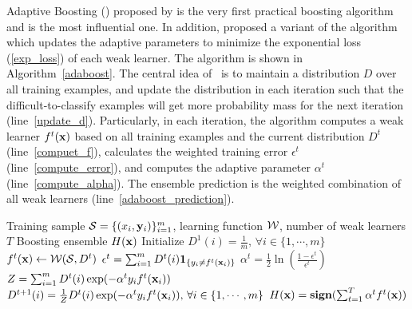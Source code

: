 {Adaptive Boosting (\adaboost) proposed by \citet{Freund97a} is the very first practical boosting algorithm and is the most influential one.
In addition, \citet{Schapire99improved} proposed a variant of the algorithm which updates the adaptive parameters to minimize the exponential loss (\ref{exp_loss}) of each weak learner.
The algorithm is shown in Algorithm~\ref{adaboost}.
The central idea of \adaboost\ is to maintain a distribution $D$ over all training examples, and update the distribution in each iteration such that the difficult-to-classify examples will get more probability mass for the next iteration (line~\ref{update_d}).
Particularly, in each iteration, the algorithm computes a weak learner $f^t(\mathbf {x})$ based on all training examples and the current distribution $D^{t}$ (line~\ref{compuet_f}), calculates the weighted training error $\epsilon^t$ (line~\ref{compute_error}), and computes the adaptive parameter $\alpha^t$ (line~\ref{compute_alpha}).
The ensemble prediction is the weighted combination of all weak learners (line~\ref{adaboost_prediction}).

\begin{algorithm}
\caption{\adaboost}
\label{adaboost}
\begin{algorithmic}[1]
	\REQUIRE Training sample $\mathcal{S} = \{(x_i,\mathbf {y}_i)\}_{i=1}^m$, learning function $\mathcal{W}$, number of weak learners $T$
	\ENSURE Boosting ensemble $H(\mathbf {x})$
	\STATE Initialize $D^1(i)=\frac{1}{m},\, \forall i\in\{1,\cdots,m\}$
		\STATE $f^t(\mathbf {x})\leftarrow\mathcal{W}(\mathcal{S},D^{t})$ \label{compuet_f}
		\STATE $\epsilon^t = \sum_{i=1}^{m}D^t(i)\mathbf{1}_{\{y_i\neq f^t(\mathbf {x}_i)\}}$ \label{compute_error}
		\STATE $\alpha^{t} = \frac{1}{2}\ln\left(\frac{1-\epsilon^t}{\epsilon^t}\right)$ \label{compute_alpha}
		\STATE $Z=\sum_{i=1}^{m}D^{t}(i)\exp(-\alpha^ty_if^t(\mathbf {x}_i))$
		\STATE $D^{t+1}(i) = \frac{1}{Z}D^{t}(i)\exp(-\alpha^ty_if^t(\mathbf {x}_i)),\, \forall i\in\{1,\cdots,m\}$ \label{update_d}
	\ENDFOR
	\RETURN $H(\mathbf {x}) = \textbf{sign}(\sum_{t=1}^T\alpha^tf^t(\mathbf {x}))$ \label{adaboost_prediction}
\end{algorithmic}
\end{algorithm}

}

